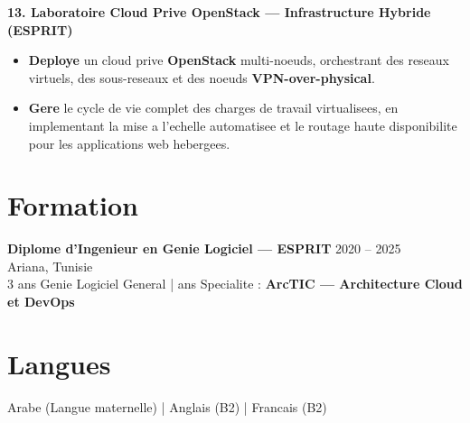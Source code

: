 \documentclass[10pt, letterpaper]{article}
\newenvironment{highlights}{
\begin{itemize}[leftmargin=12pt, itemsep=2pt]
}{
\end{itemize}
}
\begin{document}
\textbf{13. Laboratoire Cloud Prive OpenStack --- Infrastructure Hybride (ESPRIT)}
\begin{highlights}
\item \textbf{Deploye} un cloud prive \textbf{OpenStack} multi-noeuds, orchestrant des reseaux virtuels, des sous-reseaux et des noeuds \textbf{VPN-over-physical}.
\item \textbf{Gere} le cycle de vie complet des charges de travail virtualisees, en implementant la mise a l'echelle automatisee et le routage haute disponibilite pour les applications web hebergees.
\end{highlights}

\section{Formation}
\textbf{Diplome d'Ingenieur en Genie Logiciel --- ESPRIT} \hfill 2020 -- 2025 \\
Ariana, Tunisie \\
3 ans Genie Logiciel General \;| ans Specialite : \textbf{ArcTIC --- Architecture Cloud et DevOps}

\section{Langues}
Arabe (Langue maternelle) \;|\; Anglais (B2) \;|\; Francais (B2)
\end{document}
